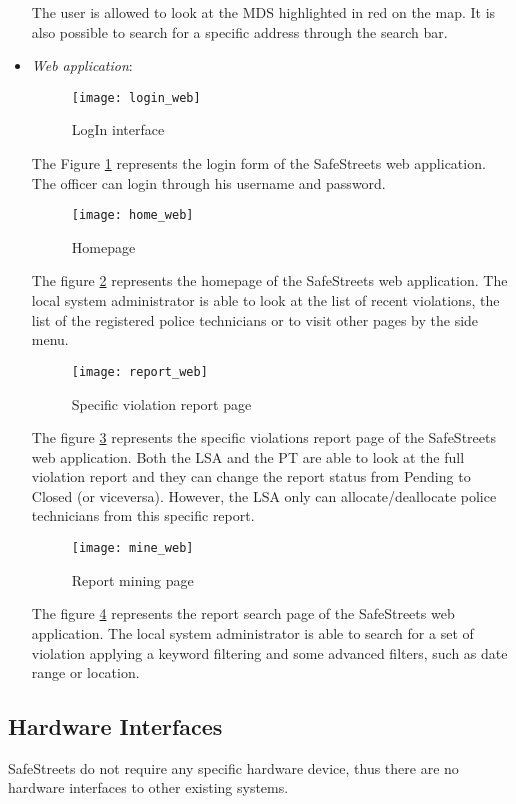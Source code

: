 \begin{itemize}
            The user is allowed to look at the MDS highlighted in red on the map. It is also
            possible to search for a specific address through the search bar.
            \newpage
    \item  \textit{Web application}:
    \begin{figure}[H]
        \centering
        \texttt{[image: login\_web]}
        \caption{LogIn interface}
        \label{fig:login_web}
    \end{figure}
    The Figure \ref{fig:login_web} represents the login form of the SafeStreets
    web application. The officer can login through his username
    and password.
    \begin{figure}[H]
        \centering
        \texttt{[image: home\_web]}
        \caption{Homepage}
        \label{fig:home_web}
    \end{figure}
    The figure \ref{fig:home_web} represents the homepage of the SafeStreets
    web application. The local system administrator is able to look at the list
    of recent violations, the list of the registered police technicians or to visit
    other pages by the side menu.
    \begin{figure}[H]
        \centering
        \texttt{[image: report\_web]}
        \caption{Specific violation report page}
        \label{fig:report_web}
    \end{figure}
    The figure \ref{fig:report_web} represents the specific violations report
    page of the SafeStreets web application. 
    Both the LSA and the PT are able to look at the full violation report and they can change the report status from Pending to Closed (or viceversa). However, the LSA only can allocate/deallocate police technicians from this specific report.
    \begin{figure}[H]
        \centering
        \texttt{[image: mine\_web]}
        \caption{Report mining page}
        \label{fig:mine_web}
    \end{figure}
    The figure \ref{fig:mine_web} represents the report search page of the SafeStreets web application. 
    The local system administrator is able to search for a set of violation applying a keyword filtering
    and some advanced filters, such as date range or location.
\end{itemize}
\newpage
\subsection{Hardware Interfaces}
SafeStreets do not require any specific hardware device, 
thus there are no hardware interfaces to other existing systems.
